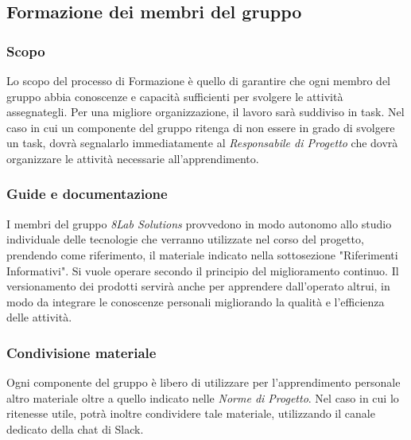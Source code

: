 	\subsection{Formazione dei membri del gruppo}
	\subsubsection{Scopo}
	Lo scopo del processo di Formazione è quello di garantire che ogni membro del gruppo abbia conoscenze e capacità sufficienti per svolgere le attività assegnategli. Per una migliore organizzazione, il lavoro sarà suddiviso in task. Nel caso in cui un componente del gruppo ritenga di non essere in grado di svolgere un task, dovrà segnalarlo immediatamente al \textit{Responsabile di Progetto} che dovrà organizzare le attività necessarie all'apprendimento.
	\subsubsection{Guide e documentazione}
	I membri del gruppo \textit{8Lab Solutions} provvedono in modo autonomo allo studio individuale delle tecnologie che verranno utilizzate nel corso del  progetto, prendendo  come  riferimento, il  materiale  indicato  nella  sottosezione "Riferimenti Informativi".
	Si vuole operare secondo il principio del miglioramento continuo.
	Il versionamento dei prodotti servirà anche per apprendere dall'operato altrui, in modo da integrare le conoscenze personali migliorando la qualità e l'efficienza delle attività.
	\subsubsection{Condivisione materiale}
	Ogni componente del gruppo è libero di utilizzare per l'apprendimento personale altro materiale oltre a quello indicato nelle \textit{Norme di Progetto}. Nel caso in cui lo ritenesse utile, potrà inoltre condividere tale materiale, utilizzando il canale dedicato della chat di Slack\glo.